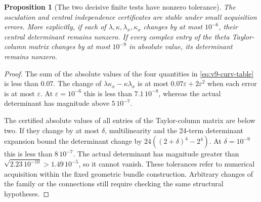 \documentclass[11pt]{article}
\newtheorem{proposition}[proposition]{Proposition}
\theoremstyle{definition}
\theoremstyle{remark}
\begin{document}
\begin{proposition}[The two decisive finite tests have nonzero tolerance]
\label{prop:v9-robust}
The osculation and central independence certificates are stable under small
acquisition errors. More explicitly, if each of
$\lambda,\kappa,\lambda_x,\kappa_x$ changes by at most $10^{-6}$, their
central determinant remains nonzero. If every complex entry of the theta
Taylor-column matrix changes by at most $10^{-9}$ in absolute value, its
determinant remains nonzero.
\end{proposition}
\begin{proof}
The sum of the absolute values of the four quantities in
\cref{eq:v9-curv-table} is less than $0.07$. The change of
$\lambda\kappa_x-\kappa\lambda_x$ is at most
$0.07\varepsilon+2\varepsilon^2$ when each error is at most
$\varepsilon$. At $\varepsilon=10^{-6}$ this is less than
$7.1\,10^{-8}$, whereas the actual determinant has magnitude above
$5\,10^{-7}$.

The certified absolute values of all entries of the Taylor-column matrix
are below two. If they change by at most $\delta$, multilinearity and the
24-term determinant expansion bound the determinant change by
$24((2+\delta)^4-2^4)$. At $\delta=10^{-9}$ this is less than
$8\,10^{-7}$. The actual determinant has magnitude greater than
$\sqrt{2.23\,10^{-10}}>1.49\,10^{-5}$, so it cannot vanish.
These tolerances refer to numerical acquisition within the fixed geometric
bundle construction. Arbitrary changes of the family or the connections
still require checking the same structural hypotheses.
\end{proof}
\end{document}
